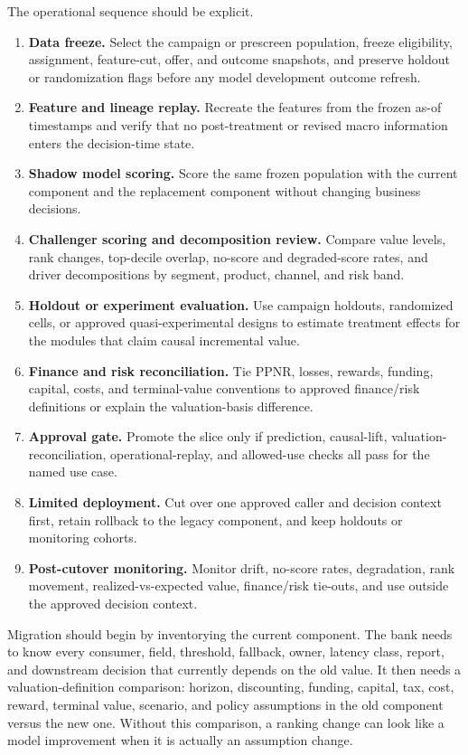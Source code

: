 \documentclass[11pt]{article}
\newcommand{\1}{\mathbf{1}}
\begin{document}
The operational sequence should be explicit.
\begin{enumerate}[label=\arabic*.]
  \item \textbf{Data freeze.} Select the campaign or prescreen population,
        freeze eligibility, assignment, feature-cut, offer, and outcome
        snapshots, and preserve holdout or randomization flags before any model
        development outcome refresh.
  \item \textbf{Feature and lineage replay.} Recreate the features from the
        frozen as-of timestamps and verify that no post-treatment or revised
        macro information enters the decision-time state.
  \item \textbf{Shadow model scoring.} Score the same frozen population with
        the current component and the replacement component without changing
        business decisions.
  \item \textbf{Challenger scoring and decomposition review.} Compare value
        levels, rank changes, top-decile overlap, no-score and degraded-score
        rates, and driver decompositions by segment, product, channel, and risk
        band.
  \item \textbf{Holdout or experiment evaluation.} Use campaign holdouts,
        randomized cells, or approved quasi-experimental designs to estimate
        treatment effects for the modules that claim causal incremental value.
  \item \textbf{Finance and risk reconciliation.} Tie PPNR, losses, rewards,
        funding, capital, costs, and terminal-value conventions to approved
        finance/risk definitions or explain the valuation-basis difference.
  \item \textbf{Approval gate.} Promote the slice only if prediction,
        causal-lift, valuation-reconciliation, operational-replay, and
        allowed-use checks all pass for the named use case.
  \item \textbf{Limited deployment.} Cut over one approved caller and decision
        context first, retain rollback to the legacy component, and keep
        holdouts or monitoring cohorts.
  \item \textbf{Post-cutover monitoring.} Monitor drift, no-score rates,
        degradation, rank movement, realized-vs-expected value, finance/risk
        tie-outs, and use outside the approved decision context.
\end{enumerate}

Migration should begin by inventorying the current component. The bank needs
to know every consumer, field, threshold, fallback, owner, latency class,
report, and downstream decision that currently depends on the old value. It
then needs a valuation-definition comparison: horizon, discounting, funding,
capital, tax, cost, reward, terminal value, scenario, and policy assumptions
in the old component versus the new one. Without this comparison, a ranking
change can look like a model improvement when it is actually an assumption
change.
\end{document}
